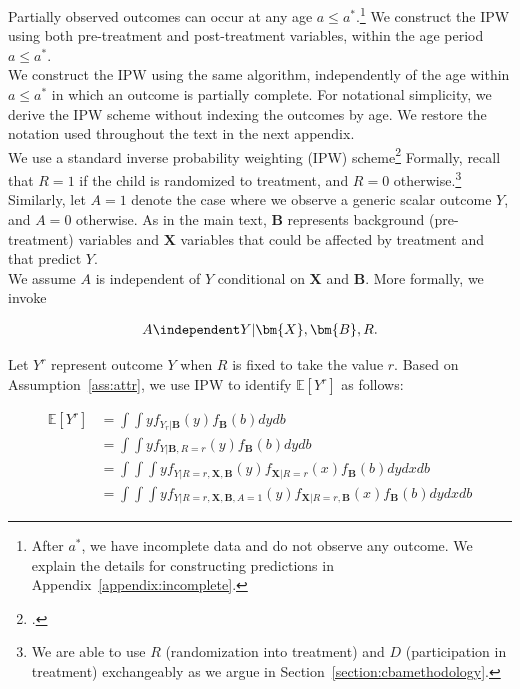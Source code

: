 \noindent Partially observed outcomes can occur at any age $a \leq a^*$.\footnote{After $a^*$, we have incomplete data and do not observe any outcome. We explain the details for constructing predictions in Appendix~\ref{appendix:incomplete}.} We construct the IPW using both pre-treatment and post-treatment variables, within the age period  $a \leq a^*$.\\

\noindent We construct the IPW using the same algorithm, independently of the age within $a \leq a^*$ in which an outcome is partially complete. For notational simplicity, we derive the IPW scheme without indexing the outcomes by age. We restore the notation used throughout the text in the next appendix. \\

\noindent We use a standard inverse probability weighting (IPW) scheme\footnote{\citet{Horvitz_Thompson_1952_JASA}.} Formally, recall that $R = 1$ if the child is randomized to treatment, and $R = 0$ otherwise.\footnote{We are able to use $R$ (randomization into treatment) and $D$ (participation in treatment) exchangeably as we argue in Section~\ref{section:cbamethodology}.} Similarly, let $A = 1$ denote the case where we observe a generic scalar outcome $Y$, and $A = 0$ otherwise. As in the main text, $\bm{B}$ represents background (pre-treatment) variables and $\bm{X}$ variables that could be affected by treatment and that predict $Y$.\\

\noindent We assume $A$ is independent of $Y$ conditional on $\bm{X}$ and $\bm{B}$. More formally, we invoke

\begin{assumption} \label{ass:attr}
	\begin{align*}
		A \independent Y | \bm{X}, \bm{B}, R.
	\end{align*}
\end{assumption}

\noindent Let $Y^{r}$ represent outcome $Y$ when $R$ is fixed to take the value $r$. Based on Assumption~\ref{ass:attr}, we use IPW to identify $\mathbb{E}[Y^r]$ as follows:

\begin{align} \label{eq:case2}
\mathbb{E}[Y^r] & = \int \int y f_{ Y_ r| \bm{B} } (y) f_{\bm{B}} (b) dydb \\ \nonumber
	           & = \int \int y f_{Y| \bm{B}, R=r}(y) f_{\bm{B}} (b) dydb \\ \nonumber
	           & = \int \int \int y f_{Y|R=r,\bm{X}, \bm{B}} (y) f_{\bm{X} | R=r} (x) f_{\bm{B}} (b) dydxdb \\ \nonumber
				& = \int \int \int y f_{Y|R=r,\bm{X}, \bm{B}, A=1} (y) f_{\bm{X} | R=r, \bm{B} }(x) f_{\bm{B}} (b) dydxdb
\end{align}

